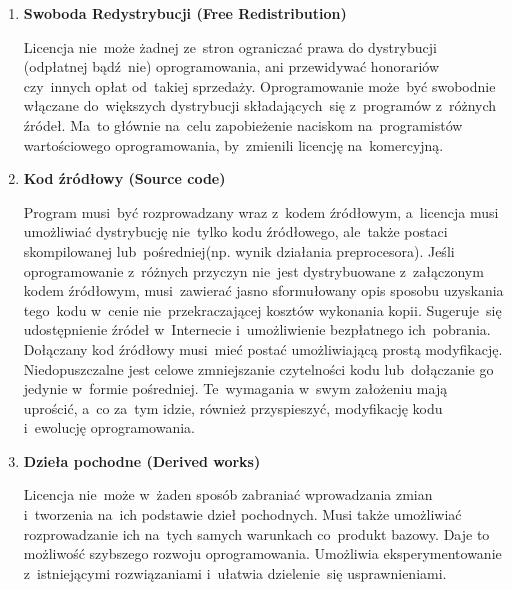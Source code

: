 \begin{enumerate}

\item{\bf Swoboda Redystrybucji (Free Redistribution)}

\nopagebreak

Licencja nie~może żadnej ze~stron ograniczać prawa do dystrybucji (odpłatnej 
bądź~nie) oprogramowania, ani przewidywać honorariów czy~innych opłat od~takiej
sprzedaży. Oprogramowanie może~być swobodnie włączane do~większych dystrybucji 
składających~się z~programów z~różnych źródeł. Ma~to głównie na~celu
zapobieżenie naciskom na~programistów wartościowego oprogramowania, by~zmienili
licencję na~komercyjną.

\item {\bf Kod źródłowy (Source code)}

\nopagebreak

Program musi~być rozprowadzany wraz z~kodem źródłowym, a~licencja musi
umożliwiać dystrybucję nie~tylko kodu źródłowego, ale~także postaci
skompilowanej lub~pośredniej(np. wynik działania preprocesora). Jeśli 
oprogramowanie z~różnych przyczyn nie~jest dystrybuowane z~załączonym kodem 
źródłowym, musi~zawierać jasno sformułowany opis sposobu uzyskania tego~kodu 
w~cenie nie~przekraczającej kosztów wykonania kopii. Sugeruje~się udostępnienie 
źródeł w~Internecie i~umożliwienie bezpłatnego ich~pobrania. Dołączany kod źródłowy
musi~mieć postać umożliwiającą prostą modyfikację. Niedopuszczalne jest celowe
zmniejszanie czytelności kodu lub~dołączanie go jedynie w~formie pośredniej.
Te~wymagania w~swym założeniu mają uprościć, a~co za~tym idzie, również
przyspieszyć, modyfikację kodu i~ewolucję oprogramowania.

\item {\bf Dzieła pochodne (Derived works)}

\nopagebreak

Licencja nie~może w~żaden sposób zabraniać wprowadzania zmian i~tworzenia na~ich
podstawie dzieł pochodnych. Musi także umożliwiać rozprowadzanie ich na~tych 
samych warunkach co~produkt bazowy. Daje to możliwość
szybszego rozwoju oprogramowania. Umożliwia eksperymentowanie z~istniejącymi
rozwiązaniami i~ułatwia dzielenie~się usprawnieniami.

\end{enumerate}